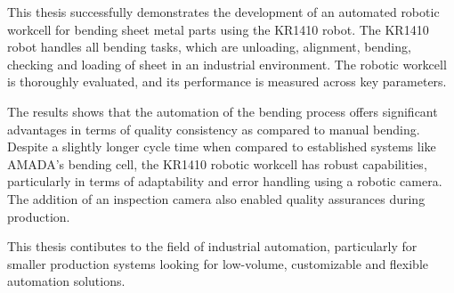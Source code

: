 This thesis successfully demonstrates the development of an automated robotic workcell for bending sheet metal parts using the KR1410 robot. The KR1410 robot handles all bending tasks, which are unloading, alignment, bending, checking and loading of sheet in an industrial environment. The robotic workcell is thoroughly evaluated, and its performance is measured across key parameters.

The results shows that the automation of the bending process offers significant advantages in terms of quality consistency as compared to manual bending. Despite a slightly longer cycle time when compared to established systems like AMADA's bending cell, the KR1410 robotic workcell has robust capabilities, particularly in terms of adaptability and error handling using a robotic camera. The addition of an inspection camera also enabled quality assurances during production.

This thesis contibutes to the field of industrial automation, particularly for smaller production systems looking for low-volume, customizable and flexible automation solutions.